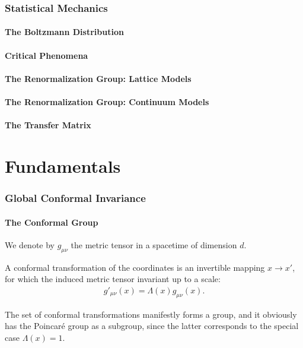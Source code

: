 \documentclass[10pt]{article}
\begin{document}
\section{Statistical Mechanics}
\subsection{The Boltzmann Distribution}
\subsection{Critical Phenomena}
\subsection{The Renormalization Group: Lattice Models}
\subsection{The Renormalization Group: Continuum Models}
\subsection{The Transfer Matrix}

\part{Fundamentals}
\section{Global Conformal Invariance}
\subsection{The Conformal Group}
We denote by $g_{\mu\nu}$ the metric tensor in a spacetime of dimension $d$.
\begin{definition}
    A conformal transformation of the coordinates is an invertible mapping $x\to x'$, for which the induced metric tensor invariant up to a scale:
    \begin{align}
        g'_{\mu\nu}(x)=\Lambda(x)g_{\mu\nu}(x).
    \end{align}
\end{definition}
The set of conformal transformations manifestly forms a group, and it obviously has the Poincar\'{e} group as a subgroup, since the latter corresponds to the special case $\Lambda(x)=1$.
\end{document}
